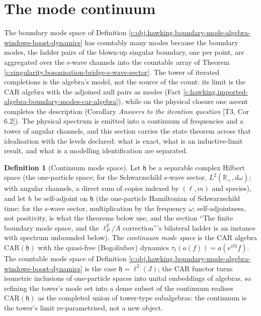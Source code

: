 \documentclass[11pt]{article}
\theoremstyle{definition}
\newtheorem{definition}[theorem]{Definition}
\theoremstyle{plain}
\providecommand{\CAR}{}\renewcommand{\CAR}{\mathrm{CAR}}
\providecommand{\R}{}\renewcommand{\R}{\mathbb{R}}
\begin{document}
\section{The mode continuum}

\label{c:note.hawking.setting-mode-continuum}
The boundary mode space of Definition \ref{c:obj.hawking.boundary-mode-algebra-windows-boost-dynamics} has countably many modes because the boundary modes, the ladder pairs of the blown-up singular boundary, one per point, are aggregated over the s-wave channels into the countable array of Theorem \ref{c:singularity.bosonisation-bridge-s-wave-sector}. The tower of iterated completions is the algebra's model, not the source of the count: its limit is the CAR algebra with the adjoined null pairs as modes (Fact \ref{c:hawking.imported-algebra-boundary-modes-car-algebra}), while on the physical closure one ascent completes the description (Corollary \emph{Answers to the iteration question} [T3, Cor 6.2]). The physical spectrum is emitted into a continuum of frequencies and a tower of angular channels, and this section carries the state theorem across that idealisation with the levels declared: what is exact, what is an inductive-limit result, and what is a modelling identification are separated.

\begin{definition}[Continuum mode space]\label{c:obj.hawking.continuum-mode-space}
Let $\mathfrak{h}$ be a separable complex Hilbert space (the one-particle space; for the Schwarzschild s-wave sector, $L^2(\R_+, d\omega)$; with angular channels, a direct sum of copies indexed by $(\ell, m)$ and species), and let $h$ be self-adjoint on $\mathfrak{h}$ (the one-particle Hamiltonian of Schwarzschild time; for the s-wave sector, multiplication by the frequency $\omega$; self-adjointness, not positivity, is what the theorems below use, and the section ``The finite boundary mode space, and the $\ell_P^2/A$ correction'''s bilateral ladder is an instance with spectrum unbounded below). The \emph{continuum mode space} is the CAR algebra $\CAR(\mathfrak{h})$ with the quasi-free (Bogoliubov) dynamics $\tau_t(a(f)) = a(e^{ith}f)$. The countable mode space of Definition \ref{c:obj.hawking.boundary-mode-algebra-windows-boost-dynamics} is the case $\mathfrak{h} = \ell^2(J)$; the CAR functor turns isometric inclusions of one-particle spaces into unital embeddings of algebras, so refining the tower's mode set into a dense subset of the continuum realises $\CAR(\mathfrak{h})$ as the completed union of tower-type subalgebras: the continuum is the tower's limit re-parametrised, not a new object.
\end{definition}
\end{document}
